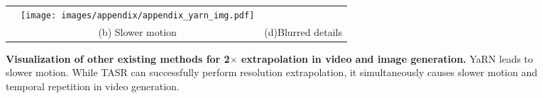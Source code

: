 \begin{figure*}
{\begin{tabular}{c|c|c}
    & 
    \begin{minipage}{0.15\textwidth}
    \centering 
    \texttt{[image: images/appendix/appendix\_yarn\_img.pdf]}
    \end{minipage}
    \\
     &  \small{(b) Slower motion} & \small{(d)Blurred details
}
    \\ \bottomrule
    \end{tabular}
    }
    \caption{\textbf{Visualization of other existing methods for 2$\times$ extrapolation in video and image generation.} YaRN leads to slower motion. While TASR can successfully perform resolution extrapolation, it simultaneously causes slower motion and temporal repetition in video generation.
    }
    \label{fig: other existing}
\end{figure*}